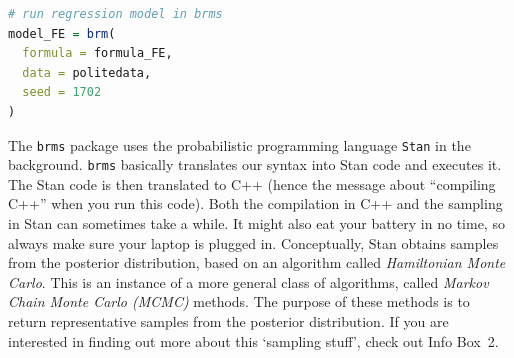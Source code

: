 \documentclass[nobib]{tufte-handout}
\begin{document}
\bigskip

\begin{minipage}[]{\textwidth}
\begin{lstlisting}[language=R]
# run regression model in brms
model_FE = brm(
  formula = formula_FE, 
  data = politedata, 
  seed = 1702 
)
\end{lstlisting}
\end{minipage}

\noindent The \texttt{brms} package uses the probabilistic programming language \texttt{Stan}
in the background. \texttt{brms} basically translates our syntax into Stan code and
executes it. The Stan code  is then translated to C++ (hence the message about ``compiling
C++'' when you run this code). Both the compilation in C++ and the sampling in Stan can sometimes take a while. It might also eat your battery in no time, so always make sure your laptop is plugged in. 
Conceptually, Stan obtains samples from the posterior distribution, based on an algorithm called \emph{Hamiltonian Monte Carlo}. This is an instance
of a more general class of algorithms, called \emph{Markov Chain Monte Carlo (MCMC)} methods. The purpose of these methods is to return representative samples from the posterior distribution.
If you are interested in finding out more about this `sampling stuff', check out Info Box~2.
\end{document}
